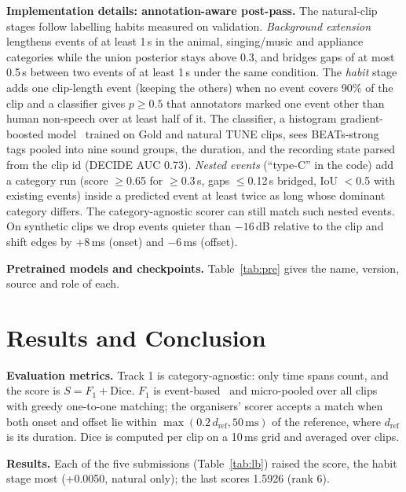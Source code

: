 \documentclass[conference,10pt]{IEEEtran}
\begin{document}
\textbf{Implementation details: annotation-aware post-pass.} The natural-clip stages follow labelling habits measured on validation. \emph{Background extension} lengthens events of at least 1\,s in the animal, singing/music and appliance categories while the union posterior stays above 0.3, and bridges gaps of at most 0.5\,s between two events of at least 1\,s under the same condition. The \emph{habit} stage adds one clip-length event (keeping the others) when no event covers 90\% of the clip and a classifier gives $p\geq0.5$ that annotators marked one event other than human non-speech over at least half of it. The classifier, a histogram gradient-boosted model~\cite{sklearn} trained on Gold and natural TUNE clips, sees BEATs-strong tags pooled into nine sound groups, the duration, and the recording state parsed from the clip id (DECIDE AUC 0.73). \emph{Nested events} (``type-C'' in the code) add a category run (score $\geq$0.65 for $\geq$0.3\,s, gaps $\leq$0.12\,s bridged, IoU $<$0.5 with existing events) inside a predicted event at least twice as long whose dominant category differs. The category-agnostic scorer can still match such nested events. On synthetic clips we drop events quieter than $-16$\,dB relative to the clip and shift edges by +8\,ms (onset) and $-6$\,ms (offset).

\textbf{Pretrained models and checkpoints.} Table~\ref{tab:pre} gives the name, version, source and role of each.

\section{Results and Conclusion}
\textbf{Evaluation metrics.} Track 1 is category-agnostic: only time spans count, and the score is $S=F_1+\mathrm{Dice}$. $F_1$ is event-based~\cite{mesaros2016} and micro-pooled over all clips with greedy one-to-one matching; the organisers' scorer accepts a match when both onset and offset lie within $\max(0.2\,d_\text{ref},50\,\text{ms})$ of the reference, where $d_\text{ref}$ is its duration. Dice is computed per clip on a 10\,ms grid and averaged over clips.

\textbf{Results.} Each of the five submissions (Table~\ref{tab:lb}) raised the score, the habit stage most (+0.0050, natural only); the last scores 1.5926 (rank 6).
\end{document}
